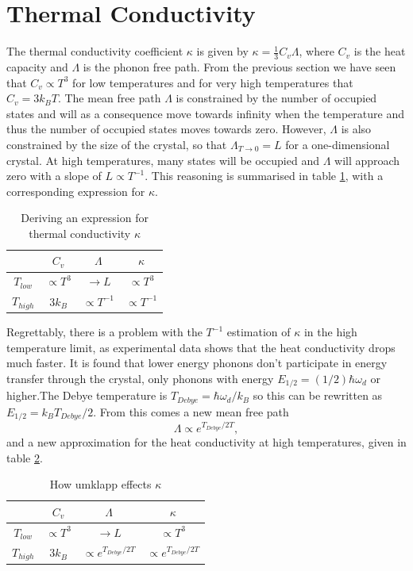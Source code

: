 \documentclass[11pt]{amsart}
\begin{document}
\setcounter{section}{5}
\section{Thermal Conductivity}
The thermal conductivity coefficient $\kappa$ is given by $\kappa = \frac{1}{3}C_v\Lambda$, where $C_v$ is the heat capacity and $\Lambda$ is the phonon free path. From the previous section we have seen that $C_v \propto T^3$ for low temperatures and for very high temperatures that $C_v = 3k_B T$. The mean free path $\Lambda$ is constrained by the number of occupied states and will as a consequence move towards infinity when the temperature and thus the number of occupied states moves towards zero. However, $\Lambda$ is also constrained by the size of the crystal, so that $\Lambda_{T\to 0} = L$ for a one-dimensional crystal. At high temperatures, many states will be occupied and $\Lambda$ will approach zero with a slope of $L \propto T^{-1}$. This reasoning is summarised in table \ref{tab:kappa1}, with a corresponding expression for $\kappa$.

\begin{table}[h]
\centering
	\caption{Deriving an expression for thermal conductivity $\kappa$}
	\begin{tabular}{c|ccc} 
			  & $C_v$ 		& $\Lambda$ 	 	& $\kappa$ \\ \hline \hline
	$T_{low}$ & $\propto T^3$ & $\to L$		 	& $\propto T^3$ \\ 
	$T_{high}$& $3k_B$		& $\propto T^{-1}$	& $\propto T^{-1}$ \\ \hline \hline
	\end{tabular}
	\label{tab:kappa1}
\end{table} 

Regrettably, there is a problem with the $T^{-1}$ estimation of $\kappa$ in the high temperature limit, as experimental data shows that the heat conductivity drops much faster. It is found that lower energy phonons don't participate in energy transfer through the crystal, only phonons with energy $E_{1/2} = (1/2)\hbar\omega_d$ or higher.The Debye temperature is $T_{Debye} = \hbar\omega_d/k_B$ so this can be rewritten as $E_{1/2} = k_B T_{Debye}/2$. From this comes a new mean free path
\begin{equation*}
\Lambda \propto e^{T_{Debye}/2T},
\end{equation*}
and a new approximation for the heat conductivity at high temperatures, given in table \ref{tab:kappa2}.

\begin{table}[h]
\centering
	\caption{How umklapp effects $\kappa$}
	\begin{tabular}{c|ccc} 
			  & $C_v$ 		& $\Lambda$ 	 	& $\kappa$ \\ \hline \hline
	$T_{low}$ & $\propto T^3$ & $\to L$		 	& $\propto T^3$ \\ 
	$T_{high}$& $3k_B$		& $\propto e^{T_{Debye}/2T}$	& $\propto e^{T_{Debye}/2T}$ \\ \hline \hline
	\end{tabular}
	\label{tab:kappa2}
\end{table} 
\end{document}
